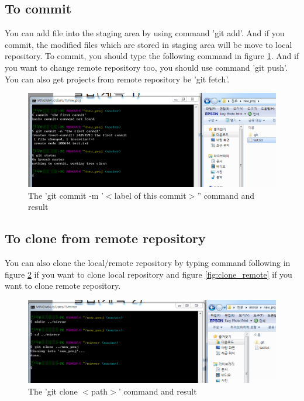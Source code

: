 \documentclass{article}
\begin{document}
    \subsection {To commit}
    You can add file into the staging area by using command 'git add'. And if you commit, the modified files which are stored in staging area will be move to local repository. To commit, you should type the following command in figure \ref{fig:commit}. And if you want to change remote repository too, you should use command 'git push'. You can also get projects from remote repository  be 'git fetch'. 
    \begin{figure}[h!]
    \centering
    \includegraphics[scale=0.5]{git_commit}
    \caption{The 'git commit -m '$<$label of this commit$>$'' command and result}
    \label{fig:commit}
    \end{figure}
    
    \subsection {To clone from remote repository}
    You can also clone the local/remote repository by typing command following in figure \ref{fig:clone_local} if you want to clone local repository and figure \ref{fig:clone_remote} if you want to clone remote repository.
    
    \begin{figure}[h!]
    \centering
    \includegraphics[scale=0.5]{git_clone_local}
    \caption{The 'git clone $<$path$>$' command and result}
    \label{fig:clone_local}
    \end{figure}
    
\end{document}
